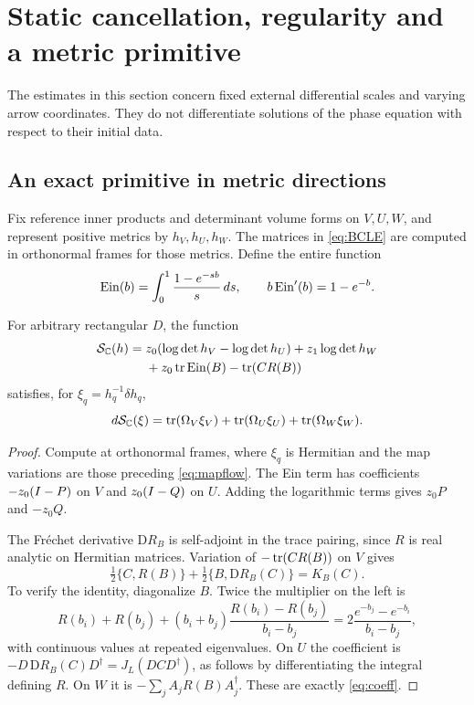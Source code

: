 \section{Static cancellation, regularity and a metric primitive}\label{sec:static}

The estimates in this section concern fixed external differential scales
and varying arrow coordinates. They do not differentiate solutions of the
phase equation with respect to their initial data.

\subsection{An exact primitive in metric directions}
Fix reference inner products and determinant volume forms on $V,U,W$,
and represent positive metrics by $h_V,h_U,h_W$. The matrices in
\eqref{eq:BCLE} are computed in orthonormal frames for those metrics.
Define the entire function
\begin{equation}\label{eq:Ein}
 \operatorname{Ein}(b)=\int_0^1\frac{1-e^{-sb}}s\,ds,\qquad
 b\operatorname{Ein}'(b)=1-e^{-b}.
\end{equation}

\begin{proposition}\label{prop:primitive}
For arbitrary rectangular $D$, the function
\begin{equation}\label{eq:primitive}
 \begin{split}
 \mathcal S_{\mathbb C}(h)
 ={}&z_0(\log\det h_V-\log\det h_U)+z_1\log\det h_W\\
 &+z_0\operatorname{tr}\operatorname{Ein}(B)-\operatorname{tr}(CR(B))
 \end{split}
\end{equation}
satisfies, for $\xi_q=h_q^{-1}\delta h_q$,
\begin{equation}\label{eq:primitivevariation}
 d\mathcal S_{\mathbb C}(\xi)=
 \operatorname{tr}(\Omega_V\xi_V)+\operatorname{tr}(\Omega_U\xi_U)+\operatorname{tr}(\Omega_W\xi_W).
\end{equation}
\end{proposition}

\begin{proof}
Compute at orthonormal frames, where $\xi_q$ is Hermitian and the
map variations are those preceding \eqref{eq:mapflow}.
The Ein term has coefficients $-z_0(I-P)$ on $V$ and
$z_0(I-Q)$ on $U$. Adding the logarithmic terms gives $z_0P$
and $-z_0Q$.

The Fr\'echet derivative $\mathrm DR_B$ is self-adjoint in the trace
pairing, since $R$ is real analytic on Hermitian matrices.
Variation of $-\operatorname{tr}(CR(B))$ on $V$ gives
\[
 \tfrac12\{C,R(B)\}+\tfrac12\{B,\mathrm DR_B(C)\}=K_B(C).
\]
To verify the identity, diagonalize $B$. Twice the multiplier on
the left is
\[
 R(b_i)+R(b_j)+(b_i+b_j)\frac{R(b_i)-R(b_j)}{b_i-b_j}
 =2\frac{e^{-b_j}-e^{-b_i}}{b_i-b_j},
\]
with continuous values at repeated eigenvalues.
On $U$ the coefficient is
$-D\,\mathrm DR_B(C)D^\dagger=J_L(DCD^\dagger)$,
as follows by differentiating the integral defining $R$.
On $W$ it is $-\sum_j A_jR(B)A_j^\dagger$.
These are exactly \eqref{eq:coeff}.
\end{proof}

